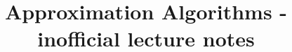 \documentclass[11pt, USenglish, oneside]{book}
\begin{document}

\begin{titlepage}
 		\title{Approximation Algorithms - inofficial lecture notes}
\end{titlepage}

\maketitle


\frontmatter
\tableofcontents

\mainmatter
{}

	
	
	
	
\backmatter
\cleardoublepage
{}
{}


\end{document}
